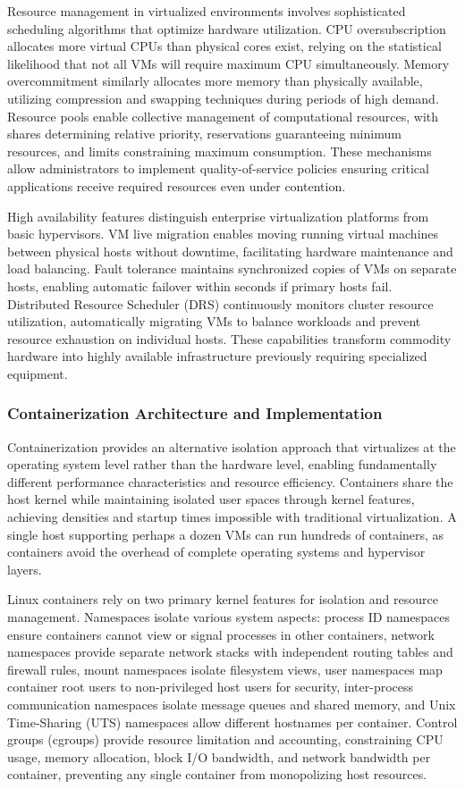 \documentclass[a4paper, 12pt]{report}
\begin{document}
Resource management in virtualized environments involves sophisticated scheduling algorithms that optimize hardware utilization. CPU oversubscription allocates more virtual CPUs than physical cores exist, relying on the statistical likelihood that not all VMs will require maximum CPU simultaneously. Memory overcommitment similarly allocates more memory than physically available, utilizing compression and swapping techniques during periods of high demand. Resource pools enable collective management of computational resources, with shares determining relative priority, reservations guaranteeing minimum resources, and limits constraining maximum consumption. These mechanisms allow administrators to implement quality-of-service policies ensuring critical applications receive required resources even under contention.

High availability features distinguish enterprise virtualization platforms from basic hypervisors. VM live migration enables moving running virtual machines between physical hosts without downtime, facilitating hardware maintenance and load balancing. Fault tolerance maintains synchronized copies of VMs on separate hosts, enabling automatic failover within seconds if primary hosts fail. Distributed Resource Scheduler (DRS) continuously monitors cluster resource utilization, automatically migrating VMs to balance workloads and prevent resource exhaustion on individual hosts. These capabilities transform commodity hardware into highly available infrastructure previously requiring specialized equipment.

\subsubsection{Containerization Architecture and Implementation}

Containerization provides an alternative isolation approach that virtualizes at the operating system level rather than the hardware level, enabling fundamentally different performance characteristics and resource efficiency. Containers share the host kernel while maintaining isolated user spaces through kernel features, achieving densities and startup times impossible with traditional virtualization. A single host supporting perhaps a dozen VMs can run hundreds of containers, as containers avoid the overhead of complete operating systems and hypervisor layers.

Linux containers rely on two primary kernel features for isolation and resource management. Namespaces isolate various system aspects: process ID namespaces ensure containers cannot view or signal processes in other containers, network namespaces provide separate network stacks with independent routing tables and firewall rules, mount namespaces isolate filesystem views, user namespaces map container root users to non-privileged host users for security, inter-process communication namespaces isolate message queues and shared memory, and Unix Time-Sharing (UTS) namespaces allow different hostnames per container. Control groups (cgroups) provide resource limitation and accounting, constraining CPU usage, memory allocation, block I/O bandwidth, and network bandwidth per container, preventing any single container from monopolizing host resources.
\end{document}
